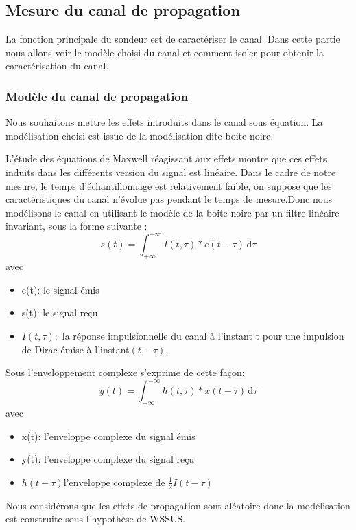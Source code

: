 \subsection{Mesure du canal de propagation}

La fonction principale du sondeur est de caractériser le canal. Dans cette partie nous allons voir le modèle choisi du canal et comment isoler pour obtenir la caractérisation du canal.

\subsubsection{Modèle du canal de propagation}	
 
Nous souhaitons mettre les effets introduits dans le canal sous équation. La modélisation choisi est issue de la modélisation dite boite noire. \\
\begin{center}

\end{center}
L'étude des équations de Maxwell réagissant aux effets montre que ces effets induits dans les différents version du signal est linéaire. Dans le cadre de notre mesure, le temps d'échantillonnage est relativement faible,
on suppose que les caractéristiques du canal n'évolue pas pendant le temps de mesure.Donc nous modélisons le canal en utilisant le modèle de la boite noire par un filtre linéaire invariant, sous la forme suivante : \\
\[ s(t)= \int_{+\infty}^{-\infty} I(t,\tau)*e(t- \tau)\,\mathrm{d}\tau \]
avec
\begin{itemize}[label=, font=\large \color{lightgray}]
\item e(t): le signal émis
\item s(t): le signal reçu
\item $I(t,\tau):$ la réponse impulsionnelle du canal à l'instant t pour une impulsion de Dirac émise à l'instant$(t-\tau).$
\end{itemize}
Sous l'enveloppement complexe s'exprime de cette façon:
\[ y(t)= \int_{+\infty}^{-\infty} h(t,\tau)*x(t- \tau)\,\mathrm{d}\tau \]
avec
\begin{itemize}[label=, font=\large \color{lightgray}]
\item x(t): l'enveloppe complexe du signal émis
\item y(t): l'enveloppe complexe du signal reçu
\item $h(t-\tau) \text{l'enveloppe complexe de } \frac{1}{2}I(t-\tau)$ 
\end{itemize}
Nous considérons que les effets de propagation sont aléatoire donc la modélisation est construite sous l'hypothèse de WSSUS.

